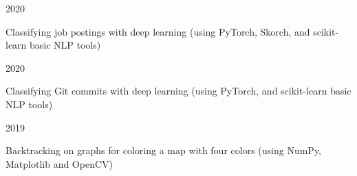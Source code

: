 

\begin{cvprojects}

  \cvproject
    {} %
    {} %
    {} %
    {2020} %
    {
      \begin{cvitems} %
        \item {Classifying job postings with deep learning (using PyTorch, Skorch, and scikit-learn basic NLP tools)}
      \end{cvitems}
    }

  \cvproject
    {} %
    {} %
    {} %
    {2020} %
    {
      \begin{cvitems} %
        \item {Classifying Git commits with deep learning (using PyTorch, and scikit-learn basic NLP tools)}
      \end{cvitems}
    }


  \cvproject
    {} %
    {} %
    {} %
    {2019} %
    {
      \begin{cvitems} %
        \item {Backtracking on graphs for coloring a map with four colors (using NumPy, Matplotlib and OpenCV)}
      \end{cvitems}
    }




\end{cvprojects}
